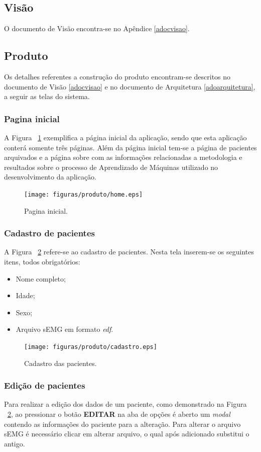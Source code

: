 \subsection{Visão}
O documento de Visão encontra-se no Apêndice \ref{adocvisao}.

\subsection{Produto}
Os detalhes referentes a construção do produto encontram-se descritos no documento de Visão \ref{adocvisao} e no documento de Arquitetura \ref{adoarquitetura}, a seguir as telas do sistema.


\subsubsection{Pagina inicial}
A Figura ~\ref{fighome} exemplifica a página inicial da aplicação, sendo que esta aplicação  conterá somente três páginas. Além da página inicial tem-se a página de pacientes arquivados e a página sobre com as informações relacionadas a metodologia e resultados sobre o processo de Aprendizado de Máquinas utilizado no desenvolvimento da aplicação.

\begin{figure}[!htb]
    \centering
    \texttt{[image: figuras/produto/home.eps]}
    \caption{Pagina inicial.}
    \label{fighome}
\end{figure}

\subsubsection{Cadastro de pacientes}
A Figura ~\ref{figcadastro} refere-se ao cadastro de pacientes. Nesta tela inserem-se os seguintes itens, todos obrigatórios:
\begin{itemize}
    \item Nome completo;
    \item Idade;
    \item Sexo;
    \item Arquivo sEMG em formato \textit{edf}.
\end{itemize}

\begin{figure}[!htb]
    \centering
    \texttt{[image: figuras/produto/cadastro.eps]}
    \caption{Cadastro das pacientes.}
    \label{figcadastro}
\end{figure}

\subsubsection{Edição de pacientes}
Para realizar a edição dos dados de um paciente, como demonstrado na Figura ~\ref{figcadastro}, ao pressionar o botão \textbf{EDITAR} na aba de opções é aberto um \textit{modal} contendo as informações do paciente para a alteração. Para alterar o arquivo sEMG é necessário clicar em alterar arquivo, o qual após adicionado substitui o antigo.

